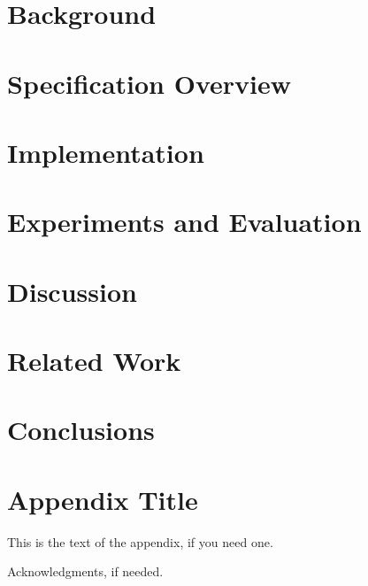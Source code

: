 \documentclass[10pt,reprint]{sigplanconf}
\begin{document}
\section{Background}
\label{background}


\section{Specification Overview}
\label{overview}


\section{Implementation}
\label{imp}


\section{Experiments and Evaluation}
\label{eval}


\section{Discussion}
\label{disc}


\section{Related Work}
\label{related}


\section{Conclusions}
\label{conc}


\appendix
\section{Appendix Title}

This is the text of the appendix, if you need one.

\acks

Acknowledgments, if needed.






%


\end{document}
